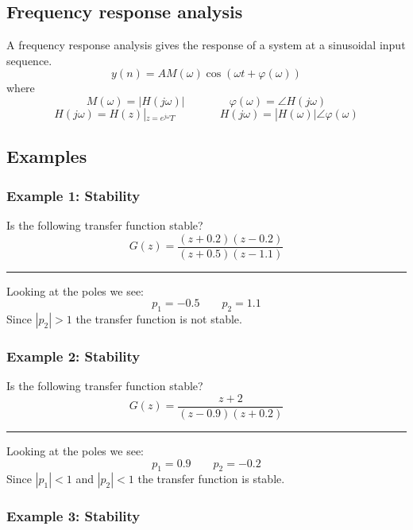\subsection{Frequency response analysis}
A frequency response analysis gives the response of a system at a sinusoidal input sequence.
$$y(n)=AM(\omega)\cos(\omega t+\varphi(\omega))$$
where
$$M(\omega)=|H(j\omega)| \qquad \qquad\varphi(\omega)=\angle H(j\omega)$$
$$H(j\omega)=H(z)|_{z=e^{j\omega}T}\qquad\qquad H(j\omega)=|H(\omega)|\angle\varphi(\omega)$$

\subsection{Examples}
\subsubsection{Example 1: Stability}
Is the following transfer function stable?
$$G(z)=\frac{(z+0.2)(z-0.2)}{(z+0.5)(z-1.1)}$$

\rule{\textwidth}{0.5pt}

Looking at the poles we see:
$$p_1=-0.5\qquad p_2=1.1$$
Since $|p_2|> 1$ the transfer function is not stable.
\subsubsection{Example 2: Stability}
Is the following transfer function stable?
$$G(z)=\frac{z+2}{(z-0.9)(z+0.2)}$$

\rule{\textwidth}{0.5pt}

Looking at the poles we see:
$$p_1=0.9\qquad p_2=-0.2$$
Since $|p_1|< 1$ and $|p_2|< 1$ the transfer function is stable.

\subsubsection{Example 3: Stability}
